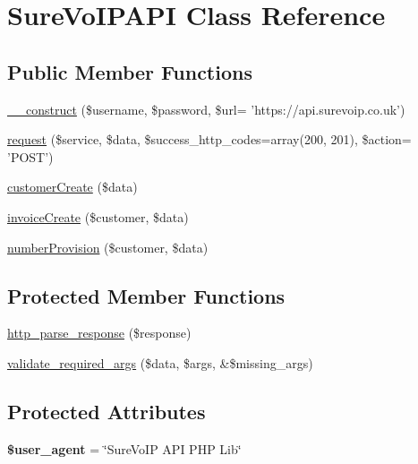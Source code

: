 \hypertarget{classSureVoIPAPI}{\section{Sure\-Vo\-I\-P\-A\-P\-I Class Reference}
\label{classSureVoIPAPI}
}
\subsection*{Public Member Functions}
\begin{DoxyCompactItemize}
\item 
\hyperlink{classSureVoIPAPI_ad17f971dc98eaa556b2f22e1ebb12838}{\-\_\-\-\_\-construct} (\$username, \$password, \$url= 'https\-://api.\-surevoip.\-co.\-uk')
\item 
\hyperlink{classSureVoIPAPI_a50f69f05636659ea39e4c1b75063aa46}{request} (\$service, \$data, \$success\-\_\-http\-\_\-codes=array(200, 201), \$action= 'P\-O\-S\-T')
\item 
\hyperlink{classSureVoIPAPI_ab57b499c8308c56ff6f16c5e690ca36d}{customer\-Create} (\$data)
\item 
\hyperlink{classSureVoIPAPI_ab5c711325b56827f817117314f247022}{invoice\-Create} (\$customer, \$data)
\item 
\hyperlink{classSureVoIPAPI_a092d0a53026405ed030c3ed804510e89}{number\-Provision} (\$customer, \$data)
\end{DoxyCompactItemize}
\subsection*{Protected Member Functions}
\begin{DoxyCompactItemize}
\item 
\hyperlink{classSureVoIPAPI_af1d1e6ac2ca47cc85fcdaa8dd2dedc20}{http\-\_\-parse\-\_\-response} (\$response)
\item 
\hyperlink{classSureVoIPAPI_a03dfd1203d791e69c252740f71a63ba8}{validate\-\_\-required\-\_\-args} (\$data, \$args, \&\$missing\-\_\-args)
\end{DoxyCompactItemize}
\subsection*{Protected Attributes}
\begin{DoxyCompactItemize}
\item 
\hypertarget{classSureVoIPAPI_a567ba8e7859cce0a7821da32562bbc5e}{{\bfseries \$user\-\_\-agent} = \char`\"{}Sure\-Vo\-I\-P A\-P\-I P\-H\-P Lib\char`\"{}}\label{classSureVoIPAPI_a567ba8e7859cce0a7821da32562bbc5e}

\end{DoxyCompactItemize}


